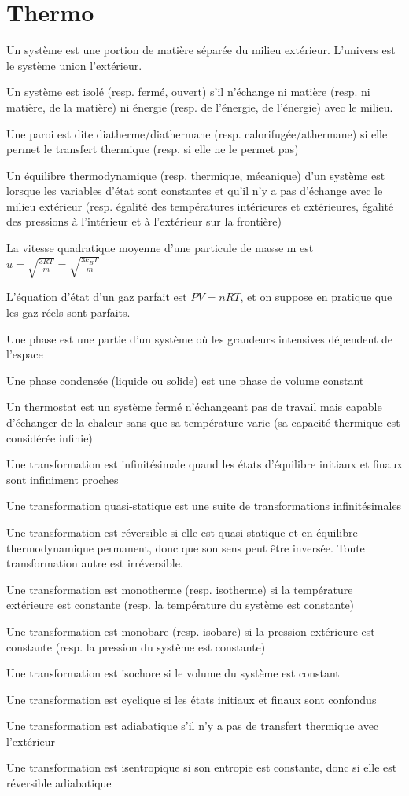 \documentclass[a4paper,12pt]{book}
\newcommand{\Def}[2]{\begin{tcolorbox}[colback=white,colframe=red!10!green!20!blue!75!, title=Définition : #1]#2\end{tcolorbox}}
\begin{document}
\chapter{Thermo}
\Def{Définitions générales}{Un système est une portion de matière séparée du milieu extérieur. L'univers est le système union l'extérieur.
\par Un système est isolé (resp. fermé, ouvert) s'il n'échange ni matière (resp. ni matière, de la matière) ni énergie (resp. de l'énergie, de l'énergie) avec le milieu.
\par Une paroi est dite diatherme/diathermane (resp. calorifugée/athermane) si elle permet le transfert thermique (resp. si elle ne le permet pas)
\par Un équilibre thermodynamique (resp. thermique, mécanique) d'un système est lorsque les variables d'état sont constantes et qu'il n'y a pas d'échange avec le milieu extérieur (resp. égalité des températures intérieures et extérieures, égalité des pressions à l'intérieur et à l'extérieur sur la frontière)
\par La vitesse quadratique moyenne d'une particule de masse m est $u=\sqrt{\frac{3RT}{m}} =\sqrt{\frac{3k_BT}{m}}$
\par L'équation d'état d'un gaz parfait est $PV=nRT$, et on suppose en pratique que les gaz réels sont parfaits.
\par Une phase est une partie d'un système où les grandeurs intensives dépendent de l'espace
\par Une phase condensée (liquide ou solide) est une phase de volume constant
\par Un thermostat est un système fermé n'échangeant pas de travail mais capable d'échanger de la chaleur sans que sa température varie (sa capacité thermique est considérée infinie)}
\Def{Transformations}{Une transformation est infinitésimale quand les états d'équilibre initiaux et finaux sont infiniment proches
\par Une transformation quasi-statique est une suite de transformations infinitésimales
\par Une transformation est réversible si elle est quasi-statique et en équilibre thermodynamique permanent, donc que son sens peut être inversée. Toute transformation autre est irréversible.
\par Une transformation est monotherme (resp. isotherme) si la température extérieure est constante (resp. la température du système est constante)
\par Une transformation est monobare (resp. isobare) si la pression extérieure est constante (resp. la pression du système est constante)
\par Une transformation est isochore si le volume du système est constant
\par Une transformation est cyclique si les états initiaux et finaux sont confondus
\par Une transformation est adiabatique s'il n'y a pas de transfert thermique avec l'extérieur
\par Une transformation est isentropique si son entropie est constante, donc si elle est réversible adiabatique}
\end{document}
